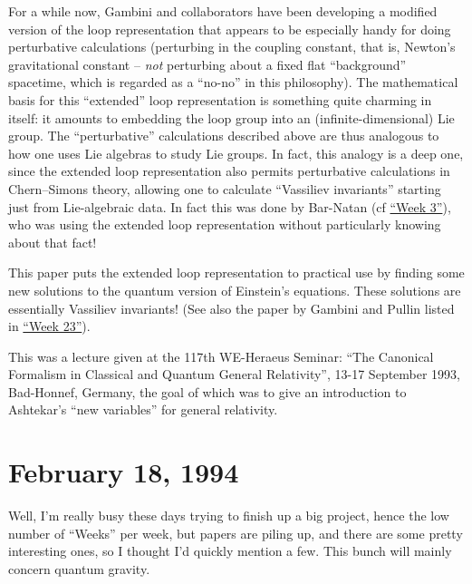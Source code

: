 \documentclass{article}
\def\tightlist{}
\renewcommand{\texttt}[1]{%
  \begingroup
  \ttfamily
  \begingroup\lccode`~=`/\lowercase{\endgroup\def~}{/\discretionary{}{}{}}%
  \begingroup\lccode`~=`[\lowercase{\endgroup\def~}{[\discretionary{}{}{}}%
  \begingroup\lccode`~=`.\lowercase{\endgroup\def~}{.\discretionary{}{}{}}%
  \catcode`/=\active\catcode`[=\active\catcode`.=\active
  \scantokens{#1\noexpand}%
  \endgroup
}
\begin{document}
For a while now, Gambini and collaborators have been developing a
modified version of the loop representation that appears to be
especially handy for doing perturbative calculations (perturbing in the
coupling constant, that is, Newton's gravitational constant --
\emph{not} perturbing about a fixed flat ``background'' spacetime, which
is regarded as a ``no-no'' in this philosophy). The mathematical basis
for this ``extended'' loop representation is something quite charming in
itself: it amounts to embedding the loop group into an
(infinite-dimensional) Lie group. The ``perturbative'' calculations
described above are thus analogous to how one uses Lie algebras to study
Lie groups. In fact, this analogy is a deep one, since the extended loop
representation also permits perturbative calculations in Chern--Simons
theory, allowing one to calculate ``Vassiliev invariants'' starting just
from Lie-algebraic data. In fact this was done by Bar-Natan (cf
\protect\hyperlink{week3}{``Week 3''}), who was using the extended loop
representation without particularly knowing about that fact!

This paper puts the extended loop representation to practical use by
finding some new solutions to the quantum version of Einstein's
equations. These solutions are essentially Vassiliev invariants! (See
also the paper by Gambini and Pullin listed in
\protect\hyperlink{week23}{``Week 23''}).


This was a lecture given at the 117th WE-Heraeus Seminar: ``The
Canonical Formalism in Classical and Quantum General Relativity'', 13-17
September 1993, Bad-Honnef, Germany, the goal of which was to give an
introduction to Ashtekar's ``new variables'' for general relativity.



\hypertarget{week31}{%
\section{February 18, 1994}\label{week31}}

Well, I'm really busy these days trying to finish up a big project,
hence the low number of ``Weeks'' per week,
but papers are piling up, and there are some pretty interesting ones, so
I thought I'd quickly mention a few. This bunch will mainly concern
quantum gravity.
\end{document}

